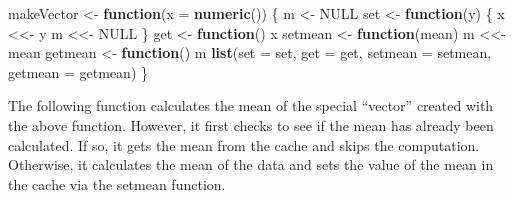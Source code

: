 \documentclass[
]{article}
\newenvironment{Shaded}{\begin{snugshade}}{\end{snugshade}}
\newcommand{\ControlFlowTok}[1]{\textcolor[rgb]{0.13,0.29,0.53}{\textbf{#1}}}
\newcommand{\DataTypeTok}[1]{\textcolor[rgb]{0.13,0.29,0.53}{#1}}
\newcommand{\KeywordTok}[1]{\textcolor[rgb]{0.13,0.29,0.53}{\textbf{#1}}}
\newcommand{\NormalTok}[1]{#1}
\newcommand{\OperatorTok}[1]{\textcolor[rgb]{0.81,0.36,0.00}{\textbf{#1}}}
\newcommand{\OtherTok}[1]{\textcolor[rgb]{0.56,0.35,0.01}{#1}}
\newcommand{\StringTok}[1]{\textcolor[rgb]{0.31,0.60,0.02}{#1}}
\begin{document}
\begin{Shaded}
\begin{Highlighting}[]
\NormalTok{makeVector \textless{}{-}}\StringTok{ }\ControlFlowTok{function}\NormalTok{(}\DataTypeTok{x =} \KeywordTok{numeric}\NormalTok{()) \{}
\NormalTok{        m \textless{}{-}}\StringTok{ }\OtherTok{NULL}
\NormalTok{        set \textless{}{-}}\StringTok{ }\ControlFlowTok{function}\NormalTok{(y) \{}
\NormalTok{                x \textless{}\textless{}{-}}\StringTok{ }\NormalTok{y}
\NormalTok{                m \textless{}\textless{}{-}}\StringTok{ }\OtherTok{NULL}
\NormalTok{        \}}
\NormalTok{        get \textless{}{-}}\StringTok{ }\ControlFlowTok{function}\NormalTok{() x}
\NormalTok{        setmean \textless{}{-}}\StringTok{ }\ControlFlowTok{function}\NormalTok{(mean) m \textless{}\textless{}{-}}\StringTok{ }\NormalTok{mean}
\NormalTok{        getmean \textless{}{-}}\StringTok{ }\ControlFlowTok{function}\NormalTok{() m}
        \KeywordTok{list}\NormalTok{(}\DataTypeTok{set =}\NormalTok{ set, }\DataTypeTok{get =}\NormalTok{ get,}
             \DataTypeTok{setmean =}\NormalTok{ setmean,}
             \DataTypeTok{getmean =}\NormalTok{ getmean)}
\NormalTok{\}}
\end{Highlighting}
\end{Shaded}

The following function calculates the mean of the special ``vector''
created with the above function. However, it first checks to see if the
mean has already been calculated. If so, it gets the mean from the cache
and skips the computation. Otherwise, it calculates the mean of the data
and sets the value of the mean in the cache via the setmean function.

\begin{Shaded}
\end{Shaded}
\end{document}
